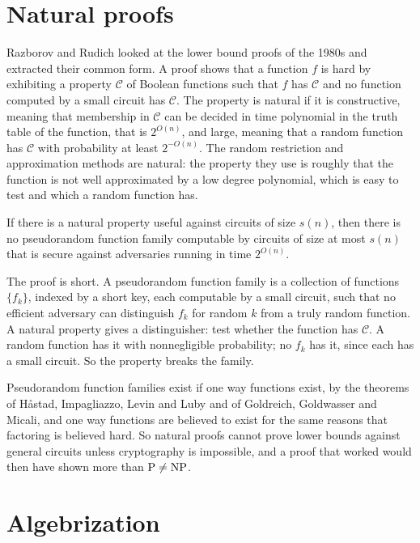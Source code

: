 \section{Natural proofs}

Razborov and Rudich looked at the lower bound proofs of the 1980s and extracted their common form. A proof shows that a function $f$ is hard by exhibiting a property $\mathcal{C}$ of Boolean functions such that $f$ has $\mathcal{C}$ and no function computed by a small circuit has $\mathcal{C}$. The property is natural if it is constructive, meaning that membership in $\mathcal{C}$ can be decided in time polynomial in the truth table of the function, that is $2^{O(n)}$, and large, meaning that a random function has $\mathcal{C}$ with probability at least $2^{-O(n)}$. The random restriction and approximation methods are natural: the property they use is roughly that the function is not well approximated by a low degree polynomial, which is easy to test and which a random function has.

\begin{theorem}
If there is a natural property useful against circuits of size $s(n)$, then there is no pseudorandom function family computable by circuits of size at most $s(n)$ that is secure against adversaries running in time $2^{O(n)}$.
\end{theorem}

The proof is short. A pseudorandom function family is a collection of functions $\{ f_k \}$, indexed by a short key, each computable by a small circuit, such that no efficient adversary can distinguish $f_k$ for random $k$ from a truly random function. A natural property gives a distinguisher: test whether the function has $\mathcal{C}$. A random function has it with nonnegligible probability; no $f_k$ has it, since each has a small circuit. So the property breaks the family.

Pseudorandom function families exist if one way functions exist, by the theorems of H{\aa}stad, Impagliazzo, Levin and Luby and of Goldreich, Goldwasser and Micali, and one way functions are believed to exist for the same reasons that factoring is believed hard. So natural proofs cannot prove lower bounds against general circuits unless cryptography is impossible, and a proof that worked would then have shown more than $\mathrm{P} \neq \mathrm{NP}$.

\section{Algebrization}

